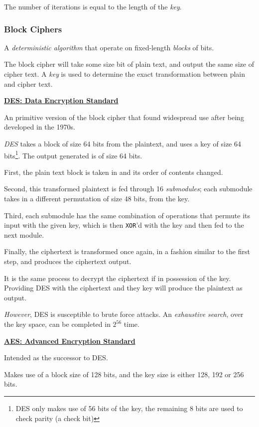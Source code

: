 \documentclass{article}
\begin{document}
The number of iterations is equal to the length of the \textit{key}.

\subsubsection{Block Ciphers}

A \textit{deterministic algorithm} that operate on fixed-length \textit{blocks} of bits.

The block cipher will take some size bit of plain text, and output the same size of cipher text. A \textit{key} is used to determine the exact transformation between plain and cipher text.

\textbf{\underline{DES: Data Encryption Standard}}

An primitive version of the block cipher that found widespread use after being developed in the 1970s.

\textit{DES} takes a block of size 64 bits from the plaintext, and uses a key of size 64 bits\footnote{DES only makes use of 56 bits of the key, the remaining 8 bits are used to check parity (a check bit)}. The output generated is of size 64 bits.

First, the plain text block is taken in and its order of contents changed.

Second, this transformed plaintext is fed through 16 \textit{submodules}; each submodule takes in a different permutation of size 48 bits, from the key.

Third, each submodule has the same combination of operations that permute its input with the given key, which is then \texttt{XOR}'d with the key and then fed to the next module.

Finally, the ciphertext is transformed once again, in a fashion similar to the first step, and produces the ciphertext output.

It is the same process to decrypt the ciphertext if in possession of the key. Providing DES with the ciphertext and they key will produce the plaintext as output.

\textit{However}, DES is susceptible to brute force attacks. An \textit{exhaustive search}, over the key space, can be completed in $2^{56}$ time.

\textbf{\underline{AES: Advanced Encryption Standard}}

Intended as the successor to DES.

Makes use of a block size of 128 bits, and the key size is either 128, 192 or 256 bits.
\end{document}
